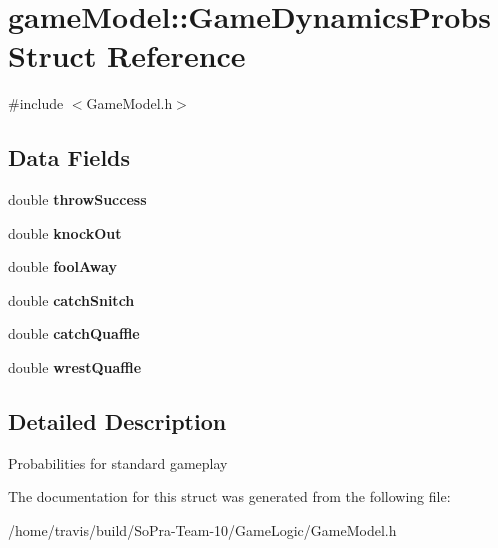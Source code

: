 \hypertarget{structgame_model_1_1_game_dynamics_probs}{\section{game\-Model\-:\-:Game\-Dynamics\-Probs Struct Reference}
\label{structgame_model_1_1_game_dynamics_probs}
}


{\ttfamily \#include $<$Game\-Model.\-h$>$}

\subsection*{Data Fields}
\begin{DoxyCompactItemize}
\item 
\hypertarget{structgame_model_1_1_game_dynamics_probs_a74398d5b822aad0c10e6e53882041884}{double {\bfseries throw\-Success}}\label{structgame_model_1_1_game_dynamics_probs_a74398d5b822aad0c10e6e53882041884}

\item 
\hypertarget{structgame_model_1_1_game_dynamics_probs_ab3e3fb13854097c6ddff28312a9aae52}{double {\bfseries knock\-Out}}\label{structgame_model_1_1_game_dynamics_probs_ab3e3fb13854097c6ddff28312a9aae52}

\item 
\hypertarget{structgame_model_1_1_game_dynamics_probs_ab270ff3325b31bc930ddcfa7b2dba937}{double {\bfseries fool\-Away}}\label{structgame_model_1_1_game_dynamics_probs_ab270ff3325b31bc930ddcfa7b2dba937}

\item 
\hypertarget{structgame_model_1_1_game_dynamics_probs_a48d76287b9322c815db5cce2e41149f5}{double {\bfseries catch\-Snitch}}\label{structgame_model_1_1_game_dynamics_probs_a48d76287b9322c815db5cce2e41149f5}

\item 
\hypertarget{structgame_model_1_1_game_dynamics_probs_a2e343d8ba7e8fe00b0802fa25a8eb1af}{double {\bfseries catch\-Quaffle}}\label{structgame_model_1_1_game_dynamics_probs_a2e343d8ba7e8fe00b0802fa25a8eb1af}

\item 
\hypertarget{structgame_model_1_1_game_dynamics_probs_a013c19aa13af71b274133592d00c4fad}{double {\bfseries wrest\-Quaffle}}\label{structgame_model_1_1_game_dynamics_probs_a013c19aa13af71b274133592d00c4fad}

\end{DoxyCompactItemize}


\subsection{Detailed Description}
Probabilities for standard gameplay 

The documentation for this struct was generated from the following file\-:\begin{DoxyCompactItemize}
\item 
/home/travis/build/\-So\-Pra-\/\-Team-\/10/\-Game\-Logic/Game\-Model.\-h\end{DoxyCompactItemize}
